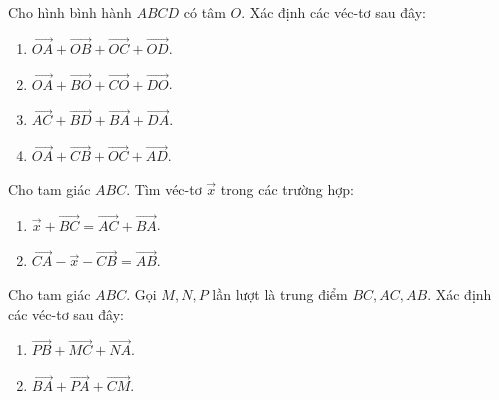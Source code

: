 \begin{bt}%
Cho hình bình hành $ABCD$ có tâm $O$. Xác định các véc-tơ sau đây:
\begin{multicols}{2}
\begin{enumerate}
	\item $\vec{OA}+\vec{OB}+\vec{OC}+\vec{OD}$.
	\item $\vec{OA}+\vec{BO}+\vec{CO}+\vec{DO}$.
	\item $\vec{AC}+\vec{BD}+\vec{BA}+\vec{DA}$.
	\item $\vec{OA}+\vec{CB}+\vec{OC}+\vec{AD}$.
\end{enumerate}
\end{multicols}
\end{bt}
\begin{bt}%
Cho tam giác $ABC$. Tìm véc-tơ $\vec{x}$ trong các trường hợp:
\begin{multicols}{2}
\begin{enumerate}
	\item $\vec{x}+\vec{BC}=\vec{AC}+\vec{BA}$.
	\item $\vec{CA}-\vec{x}-\vec{CB}=\vec{AB}$.
\end{enumerate}
\end{multicols}
\end{bt}
\begin{bt}%
	Cho tam giác $ABC$. Gọi $M,N,P$ lần lượt là trung điểm $BC,AC,AB$. Xác định các véc-tơ sau đây:
	\begin{multicols}{2}
		\begin{enumerate}
			\item $\vec{PB}+\vec{MC}+\vec{NA}$.
			\item $\vec{BA}+\vec{PA}+\vec{CM}$.
		\end{enumerate}
	\end{multicols}
\end{bt}

